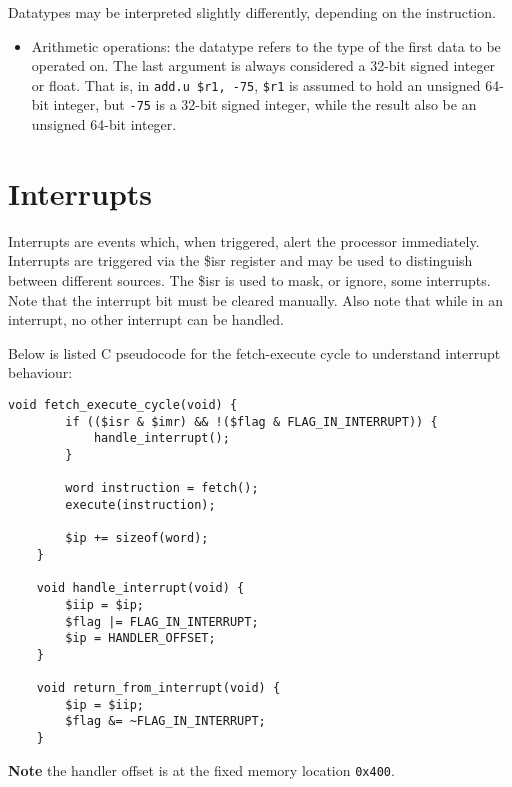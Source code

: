 \documentclass[10pt]{article}
\begin{document}
    \bigskip
    Datatypes may be interpreted slightly differently, depending on the instruction.

    \begin{itemize}
        \item Arithmetic operations: the datatype refers to the type of the first data to be operated on.
        The last argument is always considered a 32-bit signed integer or float.
        That is, in \texttt{add.u \$r1, -75}, \texttt{\$r1} is assumed to hold an unsigned 64-bit integer, but \texttt{-75} is a 32-bit signed integer, while the result also be an unsigned 64-bit integer.

    \end{itemize}

    \section{Interrupts}\label{sec:interrupts}

    Interrupts are events which, when triggered, alert the processor immediately.
    Interrupts are triggered via the \$isr register and may be used to distinguish between different sources.
    The \$isr is used to mask, or ignore, some interrupts.
    Note that the interrupt bit must be cleared manually.
    Also note that while in an interrupt, no other interrupt can be handled.

    Below is listed C pseudocode for the fetch-execute cycle to understand interrupt behaviour:

    \begin{lstlisting}[style=c,label={lst:lstlisting}]
    void fetch_execute_cycle(void) {
        if (($isr & $imr) && !($flag & FLAG_IN_INTERRUPT)) {
            handle_interrupt();
        }

        word instruction = fetch();
        execute(instruction);

        $ip += sizeof(word);
    }

    void handle_interrupt(void) {
        $iip = $ip;
        $flag |= FLAG_IN_INTERRUPT;
        $ip = HANDLER_OFFSET;
    }

    void return_from_interrupt(void) {
        $ip = $iip;
        $flag &= ~FLAG_IN_INTERRUPT;
    }
    \end{lstlisting}

    \textbf{Note} the handler offset is at the fixed memory location \texttt{0x400}.
\end{document}
